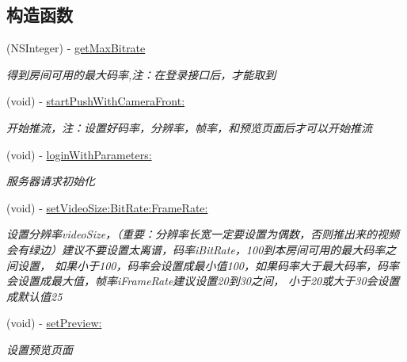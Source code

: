 \subsection*{构造函数}
\begin{DoxyCompactItemize}
\item 
\mbox{\label{interface_c_c_push_util_af81678969b596bc2e6c3e59415fde2aa}} 
(N\+S\+Integer) -\/ \hyperlink{interface_c_c_push_util_af81678969b596bc2e6c3e59415fde2aa}{get\+Max\+Bitrate}
\begin{DoxyCompactList}\small\item\em 得到房间可用的最大码率,注：在登录接口后，才能取到 \end{DoxyCompactList}\item 
(void) -\/ \hyperlink{interface_c_c_push_util_aab53c1f3bb2cdd070681aa497e4f5bf7}{start\+Push\+With\+Camera\+Front\+:}
\begin{DoxyCompactList}\small\item\em 开始推流，注：设置好码率，分辨率，帧率，和预览页面后才可以开始推流 \end{DoxyCompactList}\item 
(void) -\/ \hyperlink{interface_c_c_push_util_ae4f1a2d7f38053c47273360091c5c4ad}{login\+With\+Parameters\+:}
\begin{DoxyCompactList}\small\item\em 服务器请求初始化 \end{DoxyCompactList}\item 
\mbox{\label{interface_c_c_push_util_a1778a6c31ea2b6df39f25bdd0861450a}} 
(void) -\/ \hyperlink{interface_c_c_push_util_a1778a6c31ea2b6df39f25bdd0861450a}{set\+Video\+Size\+:\+Bit\+Rate\+:\+Frame\+Rate\+:}
\begin{DoxyCompactList}\small\item\em 设置分辨率video\+Size，（重要：分辨率长宽一定要设置为偶数，否则推出来的视频会有绿边）建议不要设置太离谱，码率i\+Bit\+Rate，100到本房间可用的最大码率之间设置， 如果小于100，码率会设置成最小值100，如果码率大于最大码率，码率会设置成最大值，帧率i\+Frame\+Rate建议设置20到30之间， 小于20或大于30会设置成默认值25 \end{DoxyCompactList}\item 
(void) -\/ \hyperlink{interface_c_c_push_util_a5d7d1fe16a235b70c8c3fe7561d565bc}{set\+Preview\+:}
\begin{DoxyCompactList}\small\item\em 设置预览页面 \end{DoxyCompactList}\item 

\end{DoxyCompactItemize}
